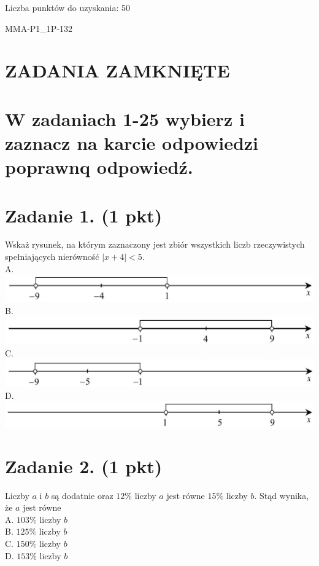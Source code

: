 \documentclass[10pt]{article}
\begin{document}
Liczba punktów do uzyskania: 50

MMA-P1\_1P-132

\section*{ZADANIA ZAMKNIĘTE}
\section*{W zadaniach 1-25 wybierz i zaznacz na karcie odpowiedzi poprawnq odpowiedź.}
\section*{Zadanie 1. (1 pkt)}
Wskaż rysunek, na którym zaznaczony jest zbiór wszystkich liczb rzeczywistych spełniających nierówność \(|x+4|<5\).\\
A.\\
\includegraphics[max width=\textwidth, center]{2024_11_21_e0e8aab895018a50a9a7g-02(3)}\\
B.\\
\includegraphics[max width=\textwidth, center]{2024_11_21_e0e8aab895018a50a9a7g-02(2)}\\
C.\\
\includegraphics[max width=\textwidth, center]{2024_11_21_e0e8aab895018a50a9a7g-02}\\
D.\\
\includegraphics[max width=\textwidth, center]{2024_11_21_e0e8aab895018a50a9a7g-02(1)}

\section*{Zadanie 2. (1 pkt)}
Liczby \(a\) i \(b\) są dodatnie oraz \(12 \%\) liczby \(a\) jest równe \(15 \%\) liczby \(b\). Stąd wynika, że \(a\) jest równe\\
A. \(103 \%\) liczby \(b\)\\
B. \(125 \%\) liczby \(b\)\\
C. \(150 \%\) liczby \(b\)\\
D. \(153 \%\) liczby \(b\)
\end{document}
